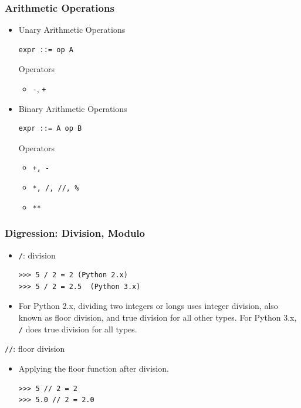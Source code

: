 \documentclass{beamer}
\begin{document}
\begin{frame}[fragile]
\frametitle{Arithmetic Operations}
\begin{itemize}
\item Unary Arithmetic Operations
\begin{center}
\begin{verbatim}
expr ::= op A
\end{verbatim}
\end{center}
\begin{block}{Operators}
\begin{itemize}
\item \texttt{-},  \texttt{+} 
\end{itemize}
\end{block}
\item Binary Arithmetic Operations
\begin{center}
\begin{verbatim}
expr ::= A op B
\end{verbatim}
\end{center}
\begin{block}{Operators}
\begin{itemize}
\item \texttt{+, -}
\item \texttt{*, /, //, \%} 
\item \texttt{**} 
\end{itemize}
\end{block}
\end{itemize}
\end{frame}
\begin{frame}[fragile]
\frametitle{Digression: Division, Modulo }

\begin{block}{}
\begin{itemize}
\item \texttt{/}: division
\begin{verbatim}
>>> 5 / 2 = 2 (Python 2.x)
>>> 5 / 2 = 2.5  (Python 3.x)
\end{verbatim}
\item For Python 2.x, dividing two integers or longs uses integer division, also known as \alert{floor division}, and \alert{true division} for all other types. For Python 3.x, \texttt{/} does \alert{true division} for all types.
\end{itemize}
\end{block}
\begin{block}{\texttt{//}: floor division}
\begin{itemize}
\item Applying the floor function after division.
\begin{verbatim}
>>> 5 // 2 = 2
>>> 5.0 // 2 = 2.0
\end{verbatim} 
\end{itemize}
\end{block}
\end{frame}
\end{document}
